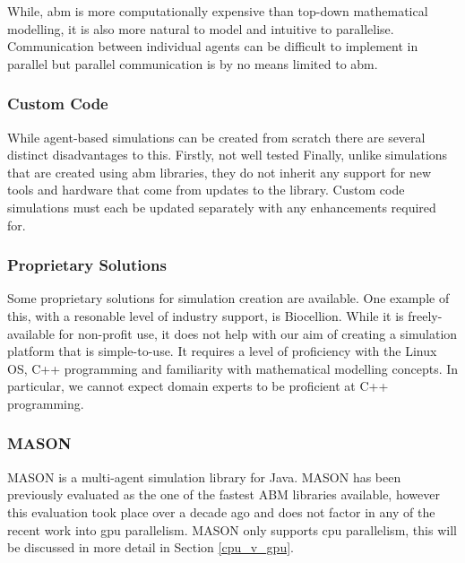 \documentclass{UoYCSproject}
\begin{document}
While, \acrlong{abm} is more computationally expensive than top-down mathematical modelling, it is also more natural to model and intuitive to parallelise\cite{flame_simulation}.
Communication between individual agents can be difficult to implement in parallel but parallel communication is by no means limited to \gls{abm}.

\subsubsection{Custom Code}
While agent-based simulations can be created from scratch\cite{phil_diss} there are several distinct disadvantages to this.
Firstly, %
    not well tested
Finally, unlike simulations that are created using \gls{abm} libraries, they do not inherit any support for new tools and hardware that come from updates to the library.
Custom code simulations must each be updated separately with any enhancements required for.


\subsubsection{Proprietary Solutions}
Some proprietary solutions for simulation creation are available.
One example of this, with a resonable level of industry support, is Biocellion\cite{biocellion}.
While it is freely-available for non-profit use, it does not help with our aim of creating a simulation platform that is simple-to-use.
It requires a level of proficiency with the Linux OS, C++ programming and familiarity with mathematical modelling concepts.
In particular, we cannot expect domain experts to be proficient at C++ programming.

\subsubsection{\gls{MASON}}
\gls{MASON} is a multi-agent simulation library for Java.
\gls{MASON} has been previously evaluated as the one of the fastest ABM libraries available\cite{abm_platforms_review}, however this evaluation took place over a decade ago and does not factor in any of the recent work into \acrshort{gpu} parallelism.
\gls{MASON} only supports \gls{cpu} parallelism, this will be discussed in more detail in Section \ref{cpu_v_gpu}.
\end{document}
